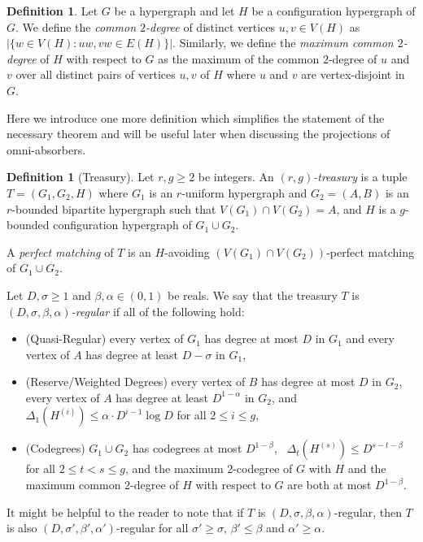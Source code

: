 \documentclass[11pt]{article}
\newcounter{i}
\theoremstyle{plain}
\theoremstyle{plain} %
\theoremstyle{definition}
\newtheorem{definition}[thm]{Definition}
\begin{document}
\begin{definition}
Let $G$ be a hypergraph and let $H$ be a configuration hypergraph of $G$. We define the \emph{common $2$-degree} of distinct vertices $u, v\in V(H)$ as $|\{w\in V(H): uw, vw\in E(H)\}|$. Similarly, we define the \emph{maximum common $2$-degree} of $H$ with respect to $G$ as the maximum of the common $2$-degree of $u$ and $v$ over all distinct pairs of vertices $u,v$ of $H$ where $u$ and $v$ are vertex-disjoint in $G$.    
\end{definition}

Here we introduce one more definition which simplifies the statement of the necessary theorem and will be useful later when discussing the projections of omni-absorbers.

\begin{definition}[Treasury]
Let $r,g \ge 2$ be integers. An \emph{$(r,g)$-treasury} is a tuple $T=(G_1,G_2,H)$ where $G_1$ is an $r$-uniform hypergraph and $G_2=(A,B)$ is an $r$-bounded bipartite hypergraph such that $V(G_1)\cap V(G_2)=A$, and $H$ is a $g$-bounded configuration hypergraph of $G_1\cup G_2$.

A \emph{perfect matching} of $T$ is an $H$-avoiding $(V(G_1)\cap V(G_2))$-perfect matching of $G_1\cup G_2$.

Let $D, \sigma\ge 1$ and $\beta,\alpha \in (0,1)$ be reals. We say that the treasury $T$ is \emph{$(D,\sigma,\beta,\alpha)$-regular} if all of the following hold:
\begin{itemize}
\item (Quasi-Regular)  every vertex of $G_1$ has degree at most $D$ in $G_1$ and every vertex of $A$ has degree at least $D-\sigma$ in $G_1$,
\item (Reserve/Weighted Degrees) every vertex of $B$ has degree at most $D$ in $G_2$, every vertex of $A$ has degree at least $D^{1-\alpha}$ in $G_2$, and $\Delta_1\left(H^{(i)}\right) \le \alpha \cdot D^{i-1}\log D$ for all $2\le i\le g$,
\item (Codegrees) $G_1\cup G_2$ has codegrees at most $D^{1-\beta}$,  ~$\Delta_{t}\left(H^{(s)}\right) \le D^{s-t-\beta}$ for all $2\le t< s\le g$, and the maximum $2$-codegree of $G$ with $H$ and the maximum common $2$-degree of $H$ with respect to $G$ are both at most $D^{1-\beta}$.
\end{itemize}
\end{definition}
It might be helpful to the reader to note that if $T$ is $(D,\sigma,\beta,\alpha)$-regular, then $T$ is also $(D,\sigma',\beta',\alpha')$-regular for all $\sigma'\ge \sigma$, $\beta' \le \beta$ and $\alpha'\ge \alpha$.
\end{document}
